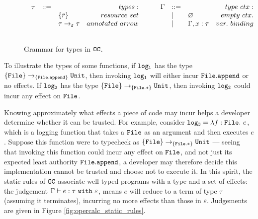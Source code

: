 \begin{figure}[h]
\vspace{-5pt}

\[
\begin{array}{lll}

\begin{array}{lllr}

\tau & ::= & ~ & types: \\
		& | & \{ \bar r \} & resource~set \\
		& | & \tau \rightarrow_{\varepsilon} \tau & annotated~arrow \\ 
		&&\\
\end{array}

	\hspace{5ex}
    
\begin{array}{lllr}

\Gamma & ::= & ~ & type~ctx: \\
				& | & \varnothing & empty~ctx. \\
				& | & \Gamma, x: \tau & var.~binding \\
				&&\\
\end{array}

\end{array}
\]

\vspace{-7pt}
\caption{Grammar for types in $\mathtt{OC}$.}
\label{fig:opercalc_types}
\end{figure}

To illustrate the types of some functions, if $\mathtt{log_1}$ has the type $\{ \mathtt{File} \} \rightarrow_{\{\mathtt{File.append}\}} \mathtt{Unit}$, then invoking $\mathtt{log_1}$ will either incur $\mathtt{File.append}$ or no effects. If $\mathtt{log_2}$ has the type $\{ \mathtt{File} \} \rightarrow_{\{\mathtt{File.*}\}} \mathtt{Unit}$, then invoking $\mathtt{log_2}$ could incur any effect on $\mathtt{File}$.

Knowing approximately what effects a piece of code may incur helps a developer determine whether it can be trusted. For example, consider $\mathtt{log_3} = \lambda f: \mathtt{File}.~e$, which is a logging function that takes a $\mathtt{File}$ as an argument and then executes $e$. Suppose this function were to typecheck as $\{ \mathtt{File} \} \rightarrow_{\{ \mathtt{File.*} \}} \mathtt{Unit}$ --- seeing that invoking this function could incur any effect on $\mathtt{File}$, and not just its expected least authority $\mathtt{File.append}$, a developer may therefore decide this implementation cannot be trusted and choose not to execute it. In this spirit, the static rules of $\mathtt{OC}$ associate well-typed programs with a type and a set of effects: the judgement $\Gamma \vdash e: \tau~\mathtt{with}~ \varepsilon$, means $e$ will reduce to a term of type $\tau$ (assuming it terminates), incurring no more effects than those in $\varepsilon$. Judgements are given in Figure \ref{fig:opercalc_static_rules}.

